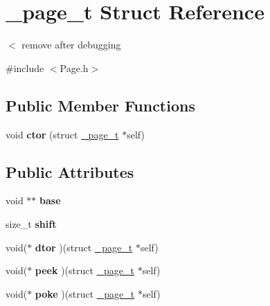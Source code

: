 \hypertarget{struct__page__t}{}\section{\+\_\+page\+\_\+t Struct Reference}
\label{struct__page__t}


$<$ remove after debugging  




{\ttfamily \#include $<$Page.\+h$>$}

\subsection*{Public Member Functions}
\begin{DoxyCompactItemize}
\item 
\hypertarget{struct__page__t_ade35703804a906c244bb2f986a6bcbad}{}void {\bfseries ctor} (struct \hyperlink{struct__page__t}{\+\_\+page\+\_\+t} $\ast$self)\label{struct__page__t_ade35703804a906c244bb2f986a6bcbad}

\end{DoxyCompactItemize}
\subsection*{Public Attributes}
\begin{DoxyCompactItemize}
\item 
\hypertarget{struct__page__t_a49fb9029db435e7aa3253f75bc413d5b}{}void $\ast$$\ast$ {\bfseries base}\label{struct__page__t_a49fb9029db435e7aa3253f75bc413d5b}

\item 
\hypertarget{struct__page__t_a2df2f5e28d8ee1c05baff75b27778226}{}size\+\_\+t {\bfseries shift}\label{struct__page__t_a2df2f5e28d8ee1c05baff75b27778226}

\item 
\hypertarget{struct__page__t_ac96e4c4ad514b7bbc6180191150828ec}{}void($\ast$ {\bfseries dtor} )(struct \hyperlink{struct__page__t}{\+\_\+page\+\_\+t} $\ast$self)\label{struct__page__t_ac96e4c4ad514b7bbc6180191150828ec}

\item 
\hypertarget{struct__page__t_a35153ca389bf1758e8c002159d9e6d12}{}void($\ast$ {\bfseries peek} )(struct \hyperlink{struct__page__t}{\+\_\+page\+\_\+t} $\ast$self)\label{struct__page__t_a35153ca389bf1758e8c002159d9e6d12}

\item 
\hypertarget{struct__page__t_aa779e2bb69a64b9765eba3ebd931f1f4}{}void($\ast$ {\bfseries poke} )(struct \hyperlink{struct__page__t}{\+\_\+page\+\_\+t} $\ast$self)\label{struct__page__t_aa779e2bb69a64b9765eba3ebd931f1f4}

\end{DoxyCompactItemize}


